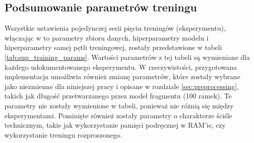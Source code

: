 \subsection{Podsumowanie parametrów treningu}

Wszystkie ustawienia pojedynczej serii pięciu treningów (eksperymentu), włączając w to parametry
zbioru danych, hiperparametry modelu i hiperparametry samej pętli treningowej, zostały przedstawione
w tabeli \ref{tab:sup_training_params}. Wartości parametrów z tej tabeli są wymieniane dla każdego
udokumentowanego eksperymentu. W rzeczywistości, przygotowana implementacja umożliwia również zmianę
parametrów, które zostały wybrane jako niezmienne dla niniejszej pracy i opisane w rozdziale
\ref{sec:preprocessing}, takich jak długość przetwarzanego przez model fragmentu (100 ramek). Te
parametry nie zostały wymienione w tabeli, ponieważ nie różnią się między eksperymentami. Pominięte
również zostały parametry o charakterze ściśle technicznym, takie jak wykorzystanie pamięci
podręcznej w RAM'ie, czy wykorzystanie treningu rozproszonego.


